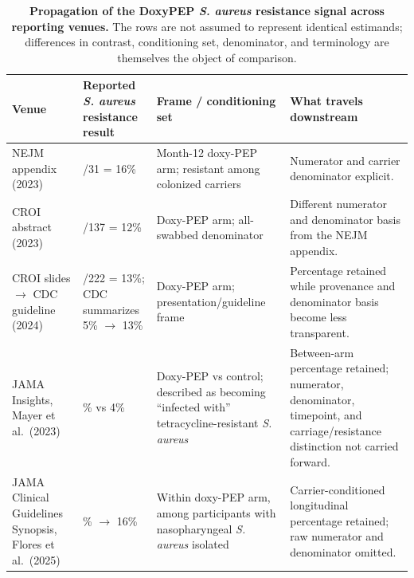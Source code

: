 \documentclass[10pt,letterpaper]{article}
\begin{document}
\begin{table}[htbp]
\centering
\small
\setlength{\tabcolsep}{4pt}
\caption{\textbf{Propagation of the DoxyPEP \emph{S. aureus} resistance
signal across reporting venues.}
The rows are not assumed to represent identical estimands; differences
in contrast, conditioning set, denominator, and terminology are
themselves the object of comparison.}
\begin{tabular}{@{}
>{\raggedright\arraybackslash}p{}
>{\raggedright\arraybackslash}p{}
>{\raggedright\arraybackslash}p{}
>{\raggedright\arraybackslash}p{}
@{}}
\toprule
\textbf{Venue} &
\textbf{Reported \emph{S. aureus} resistance result} &
\textbf{Frame / conditioning set} &
\textbf{What travels downstream} \\
\midrule

NEJM appendix (2023) \cite{luetkemeyer2023} &
5/31 = 16\%
&
Month-12 doxy-PEP arm; resistant among colonized carriers
&
Numerator and carrier denominator explicit. \\

\addlinespace

CROI abstract (2023) \cite{luetkemeyer2023croi} &
16/137 = 12\%
&
Doxy-PEP arm; all-swabbed denominator
&
Different numerator and denominator basis from the NEJM appendix. \\

\addlinespace

CROI slides $\rightarrow$ CDC guideline (2024) \cite{cdc2024doxypep} &
28/222 = 13\%; CDC summarizes 5\% $\rightarrow$ 13\%
&
Doxy-PEP arm; presentation/guideline frame
&
Percentage retained while provenance and denominator basis become less transparent. \\

\addlinespace

JAMA Insights, Mayer et al.\ (2023) \cite{mayer2023} &
5\% vs 4\%
&
Doxy-PEP vs control; described as becoming ``infected with''
tetracycline-resistant \emph{S. aureus}
&
Between-arm percentage retained; numerator, denominator, timepoint, and
carriage/resistance distinction not carried forward. \\

\addlinespace

JAMA Clinical Guidelines Synopsis, Flores et al.\ (2025) \cite{flores2025} &
5\% $\rightarrow$ 16\%
&
Within doxy-PEP arm, among participants with nasopharyngeal
\emph{S. aureus} isolated
&
Carrier-conditioned longitudinal percentage retained; raw numerator and denominator omitted. \\

\bottomrule
\end{tabular}
\end{table}
\end{document}
